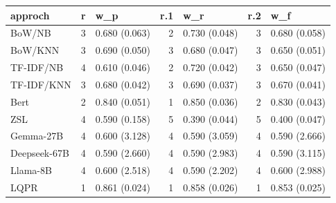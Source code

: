 \begin{tabular}{lrlrlrl}
\hline
 approch      &   r & w\_p           &   r.1 & w\_r           &   r.2 & w\_f           \\
\hline
 BoW/NB       &   3 & 0.680 (0.063) &     2 & 0.730 (0.048) &     3 & 0.680 (0.058) \\
 BoW/KNN      &   3 & 0.690 (0.050) &     3 & 0.680 (0.047) &     3 & 0.650 (0.051) \\
 TF-IDF/NB    &   4 & 0.610 (0.046) &     2 & 0.720 (0.042) &     3 & 0.650 (0.047) \\
 TF-IDF/KNN   &   3 & 0.680 (0.042) &     3 & 0.690 (0.037) &     3 & 0.670 (0.041) \\
 Bert         &   2 & 0.840 (0.051) &     1 & 0.850 (0.036) &     2 & 0.830 (0.043) \\
 ZSL          &   4 & 0.590 (0.158) &     5 & 0.390 (0.044) &     5 & 0.400 (0.047) \\
 Gemma-27B    &   4 & 0.600 (3.128) &     4 & 0.590 (3.059) &     4 & 0.590 (2.666) \\
 Deepseek-67B &   4 & 0.590 (2.660) &     4 & 0.590 (2.983) &     4 & 0.590 (3.115) \\
 Llama-8B     &   4 & 0.600 (2.518) &     4 & 0.590 (2.202) &     4 & 0.600 (2.988) \\
 LQPR         &   1 & 0.861 (0.024) &     1 & 0.858 (0.026) &     1 & 0.853 (0.025) \\
\hline
\end{tabular}